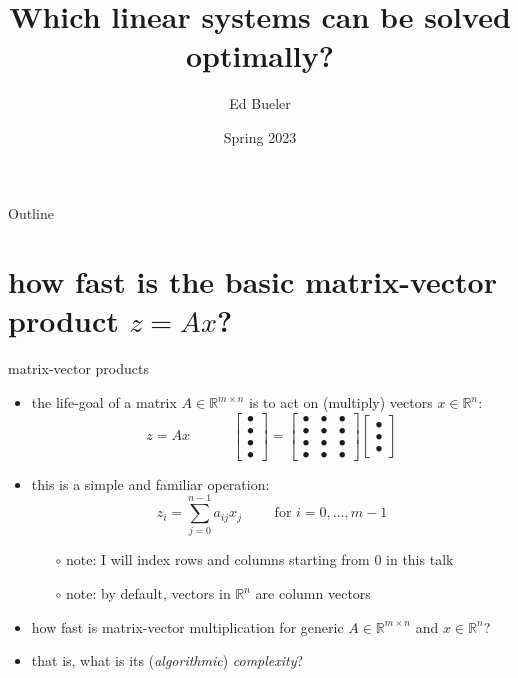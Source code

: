 \documentclass[10pt,
               svgnames,
               hyperref={colorlinks,citecolor=DeepPink4,linkcolor=FireBrick,urlcolor=Maroon},
               usepdftitle=false]{beamer}
\title{Which linear systems can be solved optimally?}
\author{Ed Bueler}
\institute[]{UAF Math 692 Scalable Seminar}
\date{Spring 2023}
\newcommand{\RR}{\mathbb{R}}
\begin{document}
\beamertemplatenavigationsymbolsempty

\begin{frame}
  \maketitle
\end{frame}

\begin{frame}{Outline}
  \tableofcontents[hideallsubsections]
\end{frame}

\section{how fast is the basic matrix-vector product $z=Ax$?}

\newcommand{\bulletax}{\begin{bmatrix} \bullet \\ \bullet \\ \bullet \\ \bullet \end{bmatrix} = \begin{bmatrix} \bullet & \bullet & \bullet \\ \bullet & \bullet & \bullet \\ \bullet & \bullet & \bullet \\ \bullet & \bullet & \bullet \end{bmatrix} \begin{bmatrix} \bullet \\ \bullet \\ \bullet \end{bmatrix}}

\begin{frame}{matrix-vector products}
\begin{itemize}
\item the life-goal of a matrix $A \in \RR^{m\times n}$ is to act on (multiply) vectors $x \in \RR^n$:
    $$z = Ax \qquad\quad \bulletax$$
\item this is a simple and familiar operation:
    $$z_i = \sum_{j=0}^{n-1} a_{ij} x_j \qquad \text{ for } i=0,\dots,m-1$$

    \begin{itemize}
    \item[$\circ$] note: I will index rows and columns starting from 0 in this talk
    \item[$\circ$] note: by default, vectors in $\RR^n$ are column vectors
    \end{itemize}

\medskip
\item how fast is matrix-vector multiplication for generic $A \in \RR^{m\times n}$ and $x \in \RR^n$?

\medskip
\item that is, what is its (\emph{algorithmic}) \emph{complexity}?
\end{itemize}
\end{frame}
\end{document}
